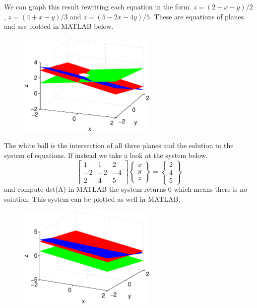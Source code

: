\begin{enumerate}
\begin{equation}
\end{equation}
We can graph this result rewriting each equation in the
form. $z=(2-x-y)/2$, $z=(4+x-y)/3$ and $z=(5-2x-4y)/5$. These are
equations of planes and are plotted in MATLAB below.
\begin{figure}[htb]
  \begin{center}
    \includegraphics[height=0.5\textwidth,width=0.6\textwidth]{Graphics/Three_Planes}
  \end{center}
\end{figure}
The white ball is the intersection of all three planes and the
solution to the system of equations. If instead we take a look at the
system below.
\begin{equation}
\begin{bmatrix} 1 & 1 & 2\\ -2 & -2 & -4 \\ 2 & 4 & 5\end{bmatrix}
\begin{Bmatrix} x \\ y \\ z \end{Bmatrix} = 
\begin{Bmatrix} 2 \\ 4 \\ 5\end{Bmatrix}
\end{equation}
and compute det(A) in MATLAB the system returns 0 which means there is
no solution. This system can be plotted as well in MATLAB. 
\begin{figure}[htb]
  \begin{center}
    \includegraphics[height=0.5\textwidth,width=0.6\textwidth]{Graphics/No_Solution3}

\end{center}
\end{figure}
\end{enumerate}

